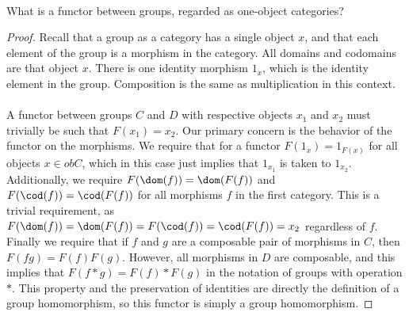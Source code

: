 \documentclass[main.tex]{subfiles}
\begin{document}
\paragraph{}
\begin{exercise}
	What is a functor between groups, regarded as one-object categories?
\end{exercise}

\begin{proof}
	Recall that a group as a category has a single object \(x\), and that each
	element of the group is a morphism in the category.  All domains and
	codomains are that object \(x\).  There is one identity morphism \(1_x\),
	which is the identity element in the group.  Composition is the same as
	multiplication in this context. \\ \\ A functor between groups \(C\) and
	\(D\) with respective objects \(x_1\) and \(x_2\) must trivially be such
	that \(F(x_1) = x_2\).  Our primary concern is the behavior of the functor
	on the morphisms. We require that for a functor \(F(1_x) = 1_{F(x)}\) for
	all objects \(x \in obC\), which in this case just implies that \(1_{x_1}\)
	is taken to \(1_{x_2}\).  Additionally, we require \(F(\dom(f)) =
	\dom(F(f))\) and \(F(\cod(f)) = \cod(F(f))\) for all morphisms \(f\) in the
	first category.  This is a trivial requirement, as \(F(\dom(f)) = \dom(F(f))
	= F(\cod(f))= \cod(F(f)) = x_2\) regardless of \(f\).  Finally we require
	that if \(f\) and \(g\) are a composable pair of morphisms in \(C\), then
	\(F(fg) = F(f)F(g)\). However, all morphisms in \(D\) are composable, and
	this implies that \(F(f*g) = F(f)*F(g)\) in the notation of groups with
	operation \(*\).  This property and the preservation of identities are
	directly the definition of a group homomorphism, so this functor is simply a
	group homomorphism.
\end{proof}
\end{document}
